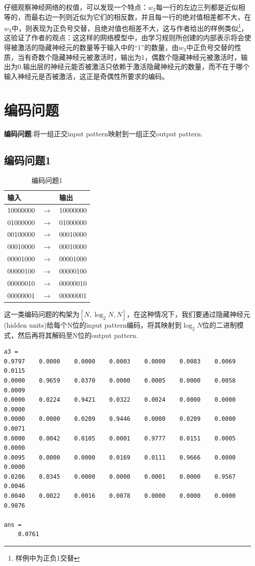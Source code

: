 仔细观察神经网络的权值，可以发现一个特点：$w_2$每一行的左边三列都是近似相等的，而最右边一列则近似为它们的相反数，并且每一行的绝对值相差都不大，在$w_3$中，则表现为正负号交替，且绝对值也相差不大，这与作者给出的样例类似\footnote{样例中为正负1交替}，这验证了作者的观点：这这样的网络模型中，由学习规则所创建的内部表示将会使得被激活的隐藏神经元的数量等于输入中的“1”的数量，由$w_3$中正负号交替的性质，当有奇数个隐藏神经元被激活时，输出为1，偶数个隐藏神经元被激活时，输出为0.输出层的神经元能否被激活只依赖于激活隐藏神经元的数量，而不在于哪个输入神经元是否被激活，这正是奇偶性所要求的编码。

\newpage
\section{编码问题}
\textbf{编码问题}:将一组正交input pattern映射到一组正交output pattern.
\subsection{编码问题1}
\begin{table}[!tbh]
\caption{\quad 编码问题1}
\centering
\begin{tabular}{c c c}  \hline
\qquad 输入\,\,\,\,\,\,\,\,\,\,\,\, &	&\qquad 输出\,\,\,\,\,\,\,\,\,\,\,\, \\ \hline
10000000&$\rightarrow$&10000000\\
01000000&$\rightarrow$&01000000\\
00100000&$\rightarrow$&00010000\\
00010000&$\rightarrow$&00010000\\
00001000&$\rightarrow$&00001000\\
00000100&$\rightarrow$&00000100\\
00000010&$\rightarrow$&00000010\\
00000001&$\rightarrow$&00000001\\\hline
\end{tabular}
\label{Tcode1}
\end{table}

这一类编码问题的构架为$[N,\log_2N,N]$，在这种情况下，我们要通过隐藏神经元(hidden units)给每个N位的input pattern编码，将其映射到$\log_2N$位的二进制模式，然后再将其解码至N位的output pattern.
\begin{lstlisting}
a3 =
0.9797    0.0000    0.0000    0.0003    0.0000    0.0083    0.0069    0.0115
0.0000    0.9659    0.0370    0.0000    0.0005    0.0000    0.0058    0.0009
0.0000    0.0224    0.9421    0.0322    0.0024    0.0000    0.0000    0.0000
0.0000    0.0000    0.0209    0.9446    0.0000    0.0209    0.0000    0.0071
0.0000    0.0042    0.0105    0.0001    0.9777    0.0151    0.0005    0.0000
0.0095    0.0000    0.0000    0.0169    0.0111    0.9666    0.0000    0.0000
0.0206    0.0345    0.0000    0.0000    0.0001    0.0000    0.9567    0.0046
0.0040    0.0022    0.0016    0.0078    0.0000    0.0000    0.0000    0.9876

ans =
    0.0761
\end{lstlisting}

